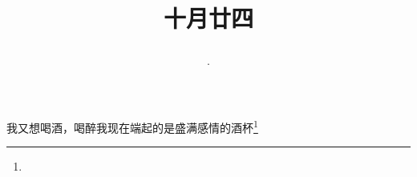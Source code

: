 \title{\date[d=24,m=11,y=2024][year:cn-y,年,month:cn,day:cn,日,·,weekday]·十月廿四 }
我又想喝酒，喝醉我现在端起的是盛满感情的酒杯\footnote{ }


